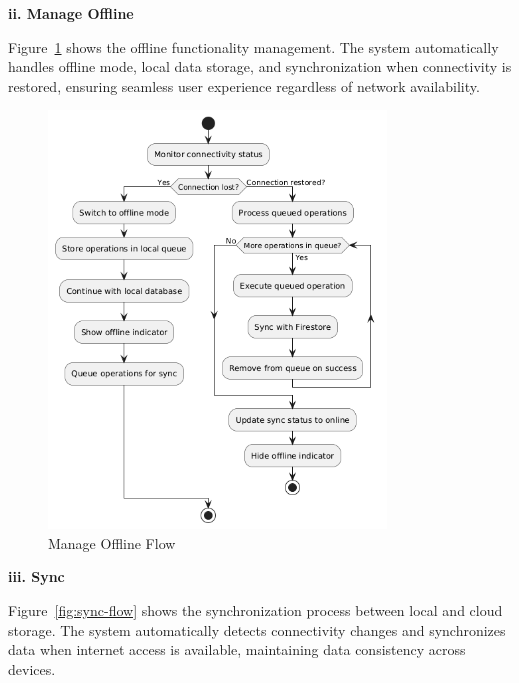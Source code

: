 \textbf{ii. Manage Offline}

Figure~\ref{fig:manage-offline-flow} shows the offline functionality management. The system automatically handles offline mode, local data storage, and synchronization when connectivity is restored, ensuring seamless user experience regardless of network availability.

\begin{figure}[H]
\centering
\includegraphics[width=0.8\textwidth]{files/imgs/manage_offline_flow.png}
\caption{Manage Offline Flow}
\label{fig:manage-offline-flow}
\end{figure}
\clearpage

\textbf{iii. Sync}

Figure~\ref{fig:sync-flow} shows the synchronization process between local and cloud storage. The system automatically detects connectivity changes and synchronizes data when internet access is available, maintaining data consistency across devices.

